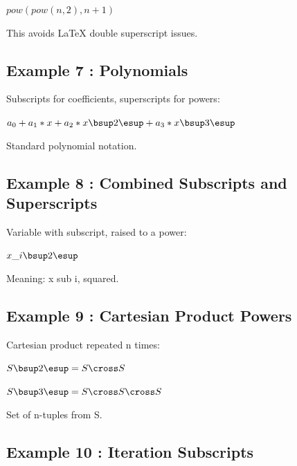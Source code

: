 \documentclass[a4paper,10pt,fleqn]{article}
\begin{document}
\noindent
$pow(pow(n, 2), n + 1)$


\noindent This avoids LaTeX double superscript issues.

\bigskip

\subsection*{Example 7 : Polynomials}

\noindent Subscripts for coefficients, superscripts for powers:

\bigskip

\noindent
$a_0 + a_1 * x + a_2 * x \bsup 2 \esup + a_3 * x \bsup 3 \esup$


\noindent Standard polynomial notation.

\bigskip

\subsection*{Example 8 : Combined Subscripts and Superscripts}

\noindent Variable with subscript, raised to a power:

\bigskip

\noindent
$x\_i \bsup 2 \esup$


\noindent Meaning: x sub i, squared.

\bigskip

\subsection*{Example 9 : Cartesian Product Powers}

\noindent Cartesian product repeated n times:

\bigskip

\noindent
$S \bsup 2 \esup = S \cross S$


\noindent
$S \bsup 3 \esup = S \cross S \cross S$


\noindent Set of n-tuples from S.

\bigskip

\subsection*{Example 10 : Iteration Subscripts}
\end{document}
